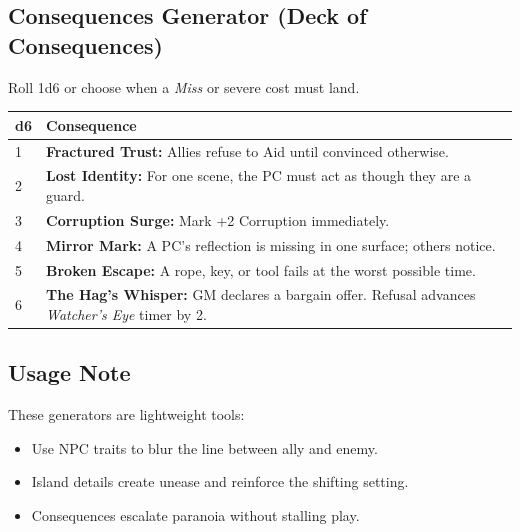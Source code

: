 \documentclass[11pt]{article}
\begin{document}
\subsection{Consequences Generator (Deck of Consequences)}
Roll 1d6 or choose when a \emph{Miss} or severe cost must land.
\begin{longtable}{@{}p{1cm}p{14cm}@{}}
\toprule
\textbf{d6} & \textbf{Consequence} \\
\midrule
1 & \textbf{Fractured Trust:} Allies refuse to Aid until convinced otherwise. \\
2 & \textbf{Lost Identity:} For one scene, the PC must act as though they are a guard. \\
3 & \textbf{Corruption Surge:} Mark +2 Corruption immediately. \\
4 & \textbf{Mirror Mark:} A PC's reflection is missing in one surface; others notice. \\
5 & \textbf{Broken Escape:} A rope, key, or tool fails at the worst possible time. \\
6 & \textbf{The Hag's Whisper:} GM declares a bargain offer. Refusal advances \emph{Watcher's Eye} timer by 2. \\
\bottomrule
\end{longtable}

\subsection{Usage Note}
These generators are lightweight tools:
\begin{itemize}
  \item Use NPC traits to blur the line between ally and enemy.  
  \item Island details create unease and reinforce the shifting setting.  
  \item Consequences escalate paranoia without stalling play.  
\end{itemize}
\end{document}
